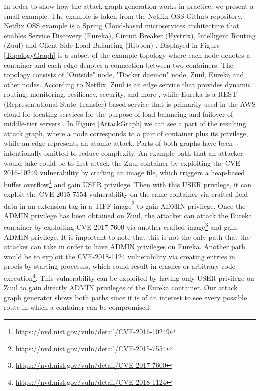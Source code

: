 In order to show how the attack graph generation works in practice, we present a small example. The example is taken from the Netflix OSS Github repository. Netflix OSS example is a Spring Cloud-based microservices architecture that enables Service Discovery (Eureka), Circuit Breaker (Hystrix), Intelligent Routing (Zuul) and Client Side Load Balancing (Ribbon) \cite{netflixoss, springcloudnetflix}. Displayed in Figure \ref{TopologyGraph} is a subset of the example topology where each node denotes a container and each edge denotes a connection between two containers. The topology consists of "Outside" node, "Docker daemon" node, Zuul, Eureka and other nodes. According to Netflix, Zuul is an edge service that provides dynamic routing, monitoring, resiliency, security, and more \cite{netflixzuul}, while Eureka is a REST (Representational State Transfer) based service that is primarily used in the AWS cloud for locating services for the purpose of load balancing and failover of middle-tier servers \cite{netflixeureka}. In Figure \ref{AttackGraph} we can see a part of the resulting attack graph, where a node corresponds to a pair of container plus its privilege, while an edge represents an atomic attack. Parts of both graphs have been intentionally omitted to reduce complexity. An example path that an attacker would take could be to first attack the Zuul container by exploiting the CVE-2016-10249 vulnerability by crafting an image file, which triggers a heap-based buffer overflow\footnote{\url{https://nvd.nist.gov/vuln/detail/CVE-2016-10249}} and gain USER privilege.  Then with this USER privilege, it can exploit the CVE-2015-7554 vulnerability on the same container via crafted field data in an extension tag in a TIFF image\footnote{\url{https://nvd.nist.gov/vuln/detail/CVE-2015-7554}} to gain ADMIN privilege. Once the ADMIN privilege has been obtained on Zuul, the attacker can attack the Eureka container by exploiting CVE-2017-7600 via another crafted image\footnote{\url{https://nvd.nist.gov/vuln/detail/CVE-2017-7600}} and gain ADMIN privilege. It is important to note that this is not the only path that the attacker can take in order to have ADMIN privileges on Eureka. Another path would be to exploit the CVE-2018-1124 vulnerability via creating entries in procfs by starting processes, which could result in crashes or arbitrary code execution\footnote{\url{https://nvd.nist.gov/vuln/detail/CVE-2018-1124}}. This vulnerability can be exploited by having only USER privilege on Zuul to gain directly ADMIN privileges of the Eureka container. Our attack graph generator shows both paths since it is of an interest to see every possible route in which a container can be compromised.



